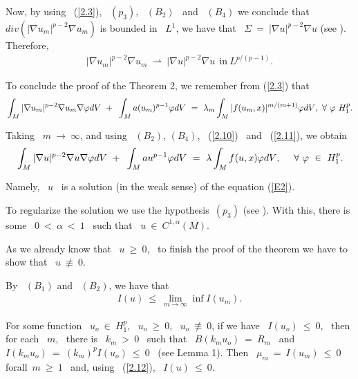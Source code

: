 \documentclass[12pt]{article}
\begin{document}
Now, by using \ (\ref{2.3}), \ $(p_3)$, \ $(B_2)$ \ and \ $(B_4)$ we conclude that \ $div(|\nabla u_m|^{p-2}\nabla u_m)$
 is bounded in \ $L^1$, we have that  \ $\Sigma \ = \ |\nabla u|^{p-2}\nabla u$ (see \cite{druet4}). Therefore,
\vspace{-0.5mm}
\begin{eqnarray}
\label{2.11}
|\nabla u_m|^{p-2}\nabla u_m \ \rightharpoonup \ |\nabla u|^{p-2}\nabla u \ \ \mbox{in} \ L^{p/(p-1)}. 
\end{eqnarray}

To conclude the proof of the Theorem 2, we remember from (\ref{2.3}) that
\vspace{-0.5mm}
$${\displaystyle}\int_M{|\nabla u_m|^{p-2}\nabla u_m\nabla \varphi dV} \ + \ {\displaystyle}\int_M{a(u_m)^{p-1}\varphi dV} \ 
= \ \lambda_m {\displaystyle}\int_M{|f(u_m,x)|^{m/(m+1)}\varphi dV}, \  \forall \ \varphi \ H^p_1.$$

Taking \ $m \ \rightarrow \ \infty$, and using \ $(B_2)$, $(B_4)$, \ (\ref{2.10}) \ and \ (\ref{2.11}), we obtain 
\vspace{-0.5mm}
$${\displaystyle}\int_M{|\nabla u|^{p-2}\nabla u\nabla \varphi dV} \ + \ {\displaystyle}\int_M{au^{p-1}\varphi dV} \ =
 \ \lambda {\displaystyle}\int_M{f(u,x)\varphi dV}, \ \ \ \ \forall \ \varphi \ \in \ H^p_1.$$

Namely, \ $u$ \ is a solution (in the weak sense) of the equation (\ref{E2}).

To regularize the solution we use the hypothesis\ $(p_3)$ (see \cite{druet4}). With this, there is some
 \ $0 \ < \ \alpha \ < \ 1$ \ such that \ $u \ \in \ C^{1,\alpha}(M)$.

As we already know that \ $u \ \geq \ 0$, \ to finish the proof of the theorem we have to show that \ $u \ \not\equiv \ 0$.
{\vspace{0.2cm}}

By \ $(B_1)$ and \ $(B_2)$, we have that
\vspace{-0.5mm}
\begin{eqnarray}
\label{2.12}
I(u) \ \leq \ \lim_{m \to \infty}\inf I(u_m). 
\end{eqnarray}

For some function \ $u_o \ \in \ H^p_1$, \ $u_o \ \geq \ 0$, \ $u_o \ \not\equiv \ 0$, if we have 
\ $I(u_o) \ \leq \ 0$, \ then for each \ $m$, \ there is \ $k_m \ > \ 0$ \ such that
 \ $B(k_mu_o) \ = \ R_m$ \ and\ $I(k_mu_o) \ = \ (k_m)^pI(u_o) \ \leq \ 0$ \ (see Lemma 1). Then
 \ $\mu_m \ = \ I(u_m) \ \leq \ 0$ forall\ $m \ \geq \ 1$ \ and, using \ (\ref{2.12}), \ $I(u) \ \leq \ 0$. 
\end{document}
